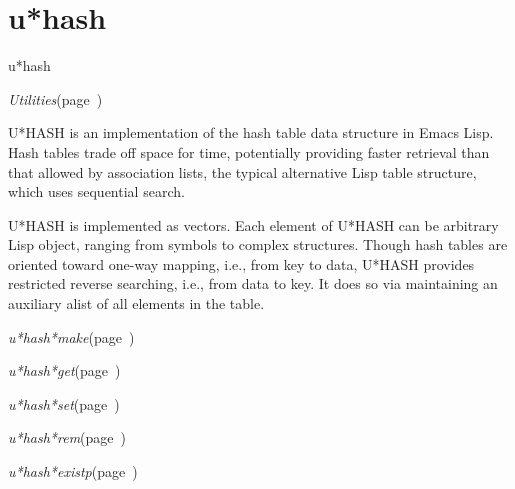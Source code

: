 \section{u*hash}
\label{u*hash}

\begin{description}
\item [Name:]  u*hash

\item [Layer:]
{\sl Utilities}\hfill(page~\pageref{Utilities})

\item [Description:]

U*HASH is an implementation of the hash table data
structure in Emacs Lisp. Hash tables trade off space for
time, potentially providing faster retrieval than that
allowed by association lists, the typical alternative
Lisp table structure, which uses sequential search.

U*HASH is implemented as vectors. Each element of U*HASH
can be arbitrary Lisp object, ranging from symbols to
complex structures. Though hash tables are oriented
toward one-way mapping, i.e., from key to data,
U*HASH provides restricted reverse searching, i.e., from
data to key. It does so via maintaining an auxiliary
alist of all elements in the table.

\item [Attributes:]

\item [Operations:]
\item {\sl u*hash*make}\hfill(page~\pageref{u*hash*make})
\item {\sl u*hash*get}\hfill(page~\pageref{u*hash*get})
\item {\sl u*hash*set}\hfill(page~\pageref{u*hash*set})
\item {\sl u*hash*rem}\hfill(page~\pageref{u*hash*rem})
\item {\sl u*hash*existp}\hfill(page~\pageref{u*hash*existp})

\item [Collections:]

\item [Subclasses:]

\item [Superclasses:]

\item [Instances:]



\end{description}
\horizontalline

